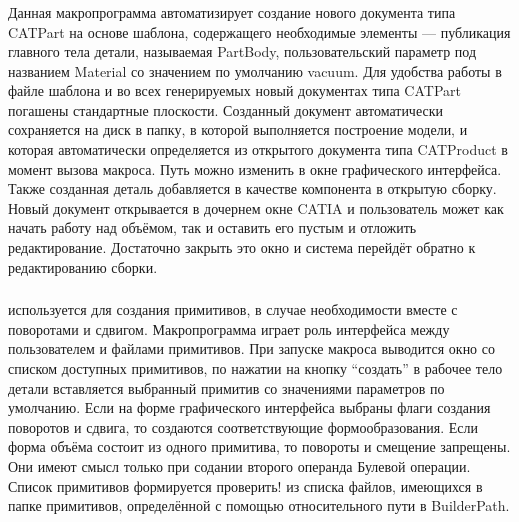 \subsubsection{}\label{sec:AddNewPart}

Данная макропрограмма автоматизирует создание нового документа типа CATPart на основе шаблона, содержащего необходимые элементы --- публикация главного тела детали, называемая PartBody, пользовательский параметр под названием Material со значением по умолчанию vacuum. Для удобства работы в файле шаблона и во всех генерируемых новый документах типа CATPart погашены стандартные плоскости. Созданный документ автоматически сохраняется на диск в папку, в которой выполняется построение модели, и которая автоматически определяется из открытого документа типа CATProduct в момент вызова макроса. Путь можно изменить в окне графического интерфейса. Также созданная деталь добавляется в качестве компонента в открытую сборку. Новый документ открывается в дочернем окне CATIA и пользователь может как начать работу над объёмом, так и оставить его пустым и отложить редактирование. Достаточно закрыть это окно и система перейдёт обратно к редактированию сборки.

\subsubsection{}\label{sec:AddShape}

 используется для создания примитивов, в случае необходимости вместе с поворотами и сдвигом. Макропрограмма играет роль интерфейса между пользователем и файлами примитивов. При запуске макроса выводится окно со списком доступных примитивов, по нажатии на кнопку ``создать'' в рабочее тело детали вставляется выбранный примитив со значениями параметров по умолчанию. Если на форме графического интерфейса выбраны флаги создания поворотов и сдвига, то создаются соответствующие формообразования. Если форма объёма состоит из одного примитива, то повороты и смещение запрещены. Они имеют смысл только при содании второго операнда Булевой операции. Список примитивов формируется \todo проверить! \todo из списка файлов, имеющихся в папке примитивов, определённой с помощью относительного пути в BuilderPath.

\subsubsection{}\label{sec:Poly}

